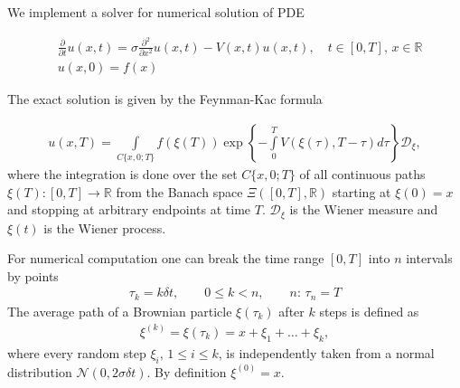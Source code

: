 \documentclass[11pt,a4paper]{extarticle}
\begin{document}
We implement a solver for numerical solution of PDE

\begin{equation}
     \begin{aligned}
     \nonumber
        & \frac\partial{\partial t} u(x, t) = \sigma \frac{\partial^2}{\partial x^2} u(x, t) - V(x, t) u(x, t), \quad t\in [0, T], \, x\in \mathbb R \\
        & u(x, 0) = f(x)
     \end{aligned}
\end{equation}

The exact solution is given by the Feynman-Kac formula

\begin{equation}
    \begin{aligned}
    \nonumber
        u(x, T) = \int\limits_{C\{x, 0; T\}} f(\xi(T)) \exp\left\{ -\int\limits_0^T V(\xi(\tau), T-\tau) d\tau \right\} \mathcal D_\xi,
    \end{aligned}
\end{equation}
where the integration is done over the set $C\{x, 0; T\}$ of all continuous paths $\xi(T) : [0, T] \rightarrow \mathbb R$ from the Banach space $\Xi([0, T], \mathbb R)$ starting at $\xi(0) = x$ and stopping at arbitrary endpoints at time $T$.
$\mathcal D_\xi$ is the Wiener measure and $\xi(t)$ is the Wiener process.

For numerical computation one can break the time range $[0, T]$ into $n$ intervals by points
\begin{equation}
    \begin{aligned}
    \nonumber
        \tau_k = k \delta t, \qquad 0 \leq k < n, \qquad n: \, \tau_n = T
    \end{aligned}
\end{equation}
The average path of a Brownian particle $\xi(\tau_k)$ after $k$ steps is defined as
\begin{equation}
    \begin{aligned}
    \nonumber
        \xi^{(k)} = \xi(\tau_k) = x + \xi_1 + \dots + \xi_k,
    \end{aligned}
\end{equation}
where every random step $\xi_i$, $1 \leq i \leq k$, is independently taken from a normal distribution $\mathcal N(0, 2\sigma\delta t)$.
By definition $\xi^{(0)} = x$.
\end{document}
